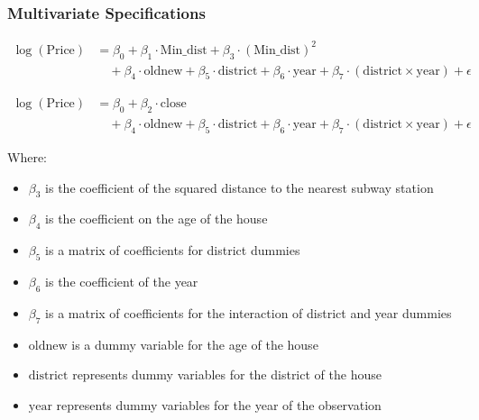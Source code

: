 \subsubsection{Multivariate Specifications}
\begin{equation}
   \begin{aligned}
   \log(\text{Price}) &= \beta_0 + \beta_1 \cdot \text{Min\_dist} + \beta_3 \cdot (\text{Min\_dist})^2 \\
   &\quad + \beta_4 \cdot \text{oldnew} + \beta_5 \cdot \text{district}
   + \beta_6 \cdot \text{year} + \beta_7 \cdot (\text{district} \times \text{year}) + \epsilon
   \end{aligned}
   \label{eq:multivariate_linear_regression}
\end{equation}
   
\begin{equation}
   \begin{aligned}
   \log(\text{Price}) &= \beta_0 + \beta_2 \cdot \text{close}\\
   &\quad + \beta_4 \cdot \text{oldnew} + \beta_5 \cdot \text{district} 
   + \beta_6 \cdot \text{year} + \beta_7 \cdot (\text{district} \times \text{year}) 
   + \epsilon
   \end{aligned}
   \label{eq:dummy_multivariate_linear_regression}
\end{equation}

Where:
\begin{itemize}
   \setlength{\itemsep}{0pt}%
   \setlength{\parskip}{0pt}%
   \setlength{\parsep}{0pt}%
      \item $\beta_3$ is the coefficient of the squared distance to the nearest subway station
      \item $\beta_4$ is the coefficient on the age of the house
      \item $\beta_5$ is a matrix of coefficients for district dummies
      \item $\beta_6$ is the coefficient of the year
      \item $\beta_7$ is a matrix of coefficients for the interaction of district and year dummies
      \item $\text{oldnew}$ is a dummy variable for the age of the house
      \item $\text{district}$ represents dummy variables for the district of the house
      \item $\text{year}$ represents dummy variables for the year of the observation
   \end{itemize}

